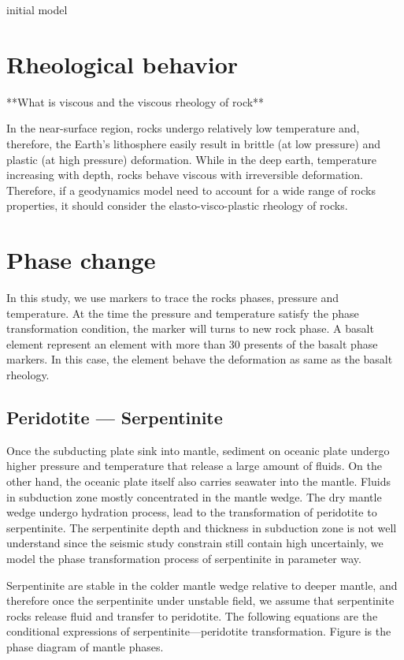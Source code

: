 initial model

\section{Rheological behavior}

**What is viscous and the viscous rheology of rock**

In the near-surface region, rocks undergo relatively low temperature and, therefore, the Earth's lithosphere easily result in brittle (at low pressure) and plastic (at high pressure) deformation. 
While in the deep earth, temperature increasing with depth, rocks behave viscous with irreversible deformation. 
Therefore, if a geodynamics model need to account for a wide range of rocks properties, it should consider the elasto-visco-plastic rheology of rocks.

\section{Phase change}

In this study, we use markers to trace the rocks phases, pressure and temperature. 
At the time the pressure and temperature satisfy the phase transformation condition, the marker will turns to new rock phase. 
A basalt element represent an element with more than 30 presents of the basalt phase markers. 
In this case, the element behave the deformation as same as the basalt rheology.

\subsection{Peridotite --- Serpentinite}

Once the subducting plate sink into mantle, sediment on oceanic plate undergo higher pressure and temperature that release a large amount of fluids. 
On the other hand, the oceanic plate itself also carries seawater into the mantle. 
Fluids in subduction zone mostly concentrated in the mantle wedge. 
The dry mantle wedge undergo hydration process, lead to the transformation of peridotite to serpentinite.  
The serpentinite depth and thickness in subduction zone is not well understand since the seismic study constrain still contain high uncertainly, we model the phase transformation process of serpentinite in parameter way.     

Serpentinite are stable in the colder mantle wedge relative to deeper mantle, and therefore once the serpentinite under unstable field, we assume that serpentinite rocks release fluid and transfer to peridotite. 
The following equations are the conditional expressions of serpentinite---peridotite transformation. Figure is the phase diagram of mantle phases.


